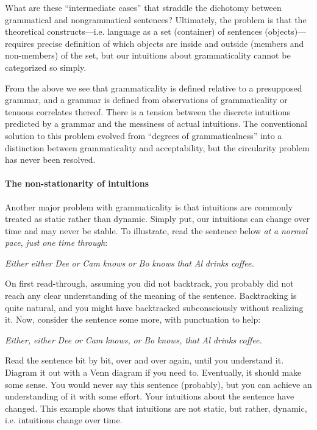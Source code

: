   What are these “intermediate cases” that straddle the dichotomy between grammatical and nongrammatical sentences? Ultimately, the problem is that the theoretical constructs—i.e. language as a set (container) of sentences (objects)—requires precise definition of which objects are inside and outside (members and non-members) of the set, but our intuitions about grammaticality cannot be categorized so simply.

  From the above we see that grammaticality is defined relative to a presupposed grammar, and a grammar is defined from observations of grammaticality or tenuous correlates thereof. There is a tension between the discrete intuitions predicted by a grammar and the messiness of actual intuitions. The conventional solution to this problem evolved from “degrees of grammaticalness” into a distinction between grammaticality and acceptability, but the circularity problem has never been resolved. 

\paragraph{The non-stationarity of intuitions}

Another major problem with grammaticality is that intuitions are commonly treated as static rather than dynamic. Simply put, our intuitions can change over time and may never be stable. To illustrate, read the sentence below \textit{at} \textit{a} \textit{normal} \textit{pace}, \textit{just} \textit{one} \textit{time} \textit{through}:

    \textit{Either} \textit{either} \textit{Dee} \textit{or} \textit{Cam} \textit{knows} \textit{or} \textit{Bo} \textit{knows} \textit{that} \textit{Al} \textit{drinks} \textit{coffee.}

On first read-through, assuming you did not backtrack, you probably did not reach any clear understanding of the meaning of the sentence. Backtracking is quite natural, and you might have backtracked subconsciously without realizing it. Now, consider the sentence some more, with punctuation to help:

    \textit{Either,} \textit{either} \textit{Dee} \textit{or} \textit{Cam} \textit{knows,} \textit{or} \textit{Bo} \textit{knows,} \textit{that} \textit{Al} \textit{drinks} \textit{coffee.}

  Read the sentence bit by bit, over and over again, until you understand it. Diagram it out with a Venn diagram if you need to. Eventually, it should make some sense. You would never say this sentence (probably), but you can achieve an understanding of it with some effort. Your intuitions about the sentence have changed. This example shows that intuitions are not static, but rather, dynamic, i.e. intuitions change over time.

